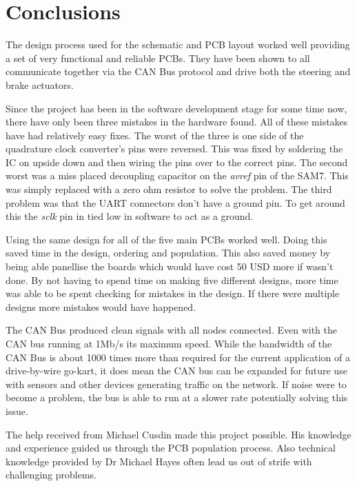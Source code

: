 \section{Conclusions}
  The design process used for the schematic and PCB layout worked well providing
  a set of very functional and reliable PCBs. They have been shown to all
  communicate together via the CAN Bus protocol and drive both the steering and
  brake actuators. 

  Since the project has been in the software development stage for some time
  now, there have only been three mistakes in the hardware found. All of these
  mistakes have had relatively easy fixes. The worst of the three is one side of
  the quadrature clock converter's pins were reversed. This was fixed by
  soldering the IC on upside down and then wiring the pins over to the correct
  pins. The second worst was a miss placed decoupling capacitor on the
  \emph{avref} pin of the SAM7. This was simply replaced with a zero ohm
  resistor to solve the problem. The third problem was that the UART connectors
  don't have a ground pin. To get around this the \emph{sclk} pin in tied low in
  software to act as a ground.

  Using the same design for all of the five main PCBs worked well. Doing this
  saved time in the design, ordering and population. This also saved money by
  being able panellise the boards which would have cost 50 USD more if wasn't
  done. By not having to spend time on making five different designs, more time
  was able to be spent checking for mistakes in the design. If there were
  multiple designs more mistakes would have happened.

  The CAN Bus produced clean signals with all nodes connected. Even with the CAN
  bus running at 1Mb/s its maximum speed. While the bandwidth of the CAN Bus is
  about 1000 times more than required for the current application of a
  drive-by-wire go-kart, it does mean the CAN bus can be expanded for future
  use with sensors and other devices generating traffic on the network. If noise
  were to become a problem, the bus is able to run at a slower rate potentially
  solving this issue.
  \newpage

  The help received from Michael Cusdin made this project possible. His
  knowledge and experience guided us through the PCB population process. Also
  technical knowledge provided by Dr Michael Hayes often lead us out of strife
  with challenging problems.
